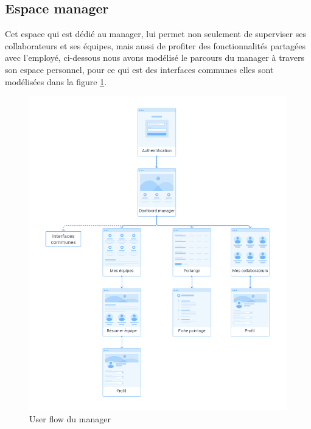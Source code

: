             \clearpage
       
        \subsection{Espace manager}
            Cet espace qui est dédié au manager, lui permet non seulement de superviser ses collaborateurs et ses équipes, mais aussi de profiter des fonctionnalités partagées avec l’employé, ci-dessous nous avons modélisé le parcours du manager à travers son espace personnel, pour ce qui est des interfaces communes elles sont modélisées dans la figure \ref{fig95}.
      
            \begin{figure}[h!]
                         \vspace{-10pt}
                         \centering
                            \includegraphics[scale=0.38 ]{images/interface/Espace manager.png}
                         \vspace{-30pt}
                         \caption{User flow du manager}
                         \label{fig95}
            \end{figure}
            
